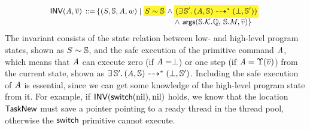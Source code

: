 \[
    \small
    \begin{array}{l}
        \!\!
        \INV{(\primcom, \args{\val})} \, \define \,
        \{
            (\state, \hpstate, \primcom, \word) \sepline
            \colorbox{yellow!80}{\!$\stateRel{\state}{\hpstate}$\!}
            \land
            \colorbox{yellow!80}
            {\!\!\!
                $(\exists \, \hpstate'. \,
                \primMultiTrans
                    {(\primcom, \hpstate)}
                    {*}{(\primdone, \hpstate')})$
            \!\!\!} \\
            \hspace*{15.8em}
            \land \
            \arguments(\hpstate.\hthrdlocalst.\hRstate, \,
            \hpstate.\Mem, \args{\val})
        \}
    \end{array}
\]
The invariant consists of the state relation between low- and
high-level program states,
shown as ${S} \sim {\mathbb{S}}$, 
and the safe execution of the primitive 
command $\textit{A}$, which means that 
$\textit{A}$ can execute 
zero (if $\textit{A} = \perp$)
or one step (if $\textit{A} = \Upsilon(\overline{v})$) 
from the current state, shown as 
$\exists \, \mathbb{S}'. \,
    {(\textit{A}, \mathbb{S})} \dashrightarrow^{*} {(\perp, \mathbb{S}')}$. 
Including the safe execution of
$\textit{A}$ is essential, 
since we can get some knowledge of the high-level program
state from it.
For example, if $\textsf{INV}{(\mathsf{switch}(\text{nil}), \text{nil})}$
holds, we know that the location $\mathsf{TaskNew}$
must save a pointer pointing to a ready thread
in the thread pool, otherwise the $\mathsf{switch}$ primitive cannot execute.
